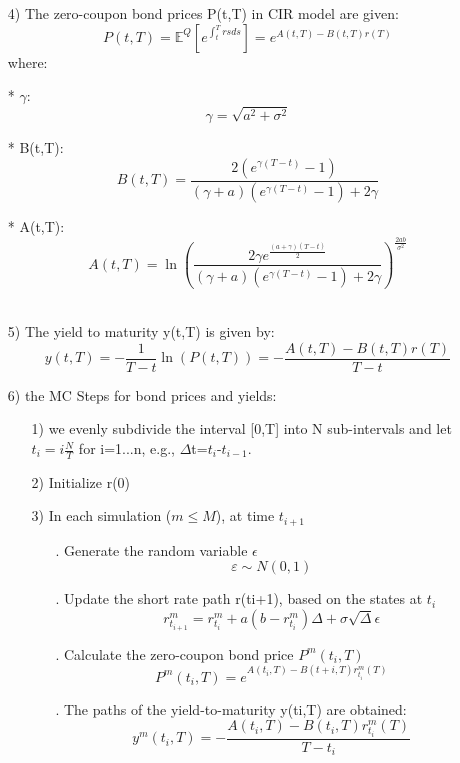 \documentclass[14pt]{extarticle}
\begin{document}
\begin{itemize}
\begin{itemize}
\item [4)] The zero-coupon bond prices P(t,T) in CIR model are given:
$$P(t,T)= \mathbb{E}^Q[e^{\int_t^T  rs ds}]=e^{A(t,T)-B(t,T)r(T)} $$
where:
\item[*]$\gamma$:
$$ \gamma=\sqrt{a^2+\sigma^2}$$
\item[*]B(t,T):
$$   B(t,T)=\frac{ 2(e^{\gamma(T-t)}-1)    } { (\gamma+a)(e^{\gamma(T-t)}-1 ) +2\gamma  }   $$

\item[*]A(t,T):
$$  A(t,T)=\ln({\frac{ 2\gamma e^{\frac{(a+\gamma)(T-t)}{2}} }{(\gamma+a)(e^{\gamma(T-t)}-1 ) +2\gamma    }   } )^{\frac{2ab}{\sigma^2}}$$\\
\end{itemize}

\begin{itemize}
\item [5)]The yield to maturity y(t,T) is given by:
$$ y(t,T)= -\frac{1}{T-t}\ln(P(t,T)) =-\frac{A(t,T)-B(t,T)r(T)}{T-t}  $$
\end{itemize}

  
  
\end{itemize}
\newpage
\begin{itemize}
    \item [6)] the MC Steps for bond prices and yields:
    \begin{itemize}
        \item [1)]we evenly subdivide the interval [0,T] into N sub-intervals and let $t_i=i\frac{N}{T} $ for i=1...n, e.g., $\Delta$t=$t_i$-$t_{i-1}$.\\
        \item[2)]Initialize r(0)\\
        \item[3)]In each simulation ($m\leq M$), at time $t_{i+1}$
        \begin{itemize}
            \item [.]Generate the random variable $\epsilon$
           $$ \varepsilon \sim N(0, 1)$$
           \item[.]Update the short rate path r(ti+1), based on the states at $t_i$
           $$ r_{t_{i+1}}^m =  r_{t_{i}}^m +a(b-r_{t_{i}}^m ) \Delta+\sigma\sqrt{\Delta}\epsilon $$
           \item[.]Calculate the zero-coupon bond price $P^m(t_i,T)$
           $$P^m(t_i,T)=e^{A(t_i,T)-B(t+i,T)r_{t_i}^m(T)} $$
           \item[.]The paths of the yield-to-maturity y(ti,T) are obtained:
           $$ y^m(t_i,T)=-\frac{A(t_i,T)-B(t_i,T)r_{t_i}^m(T)}{T-t_i}  $$
        \end{itemize}
    \end{itemize}
\end{itemize}
\end{document}
